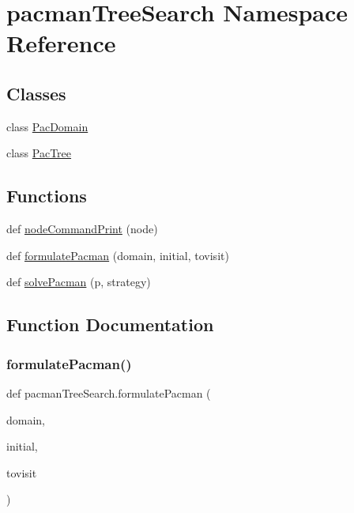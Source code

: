 \hypertarget{namespacepacman_tree_search}{}\section{pacman\+Tree\+Search Namespace Reference}
\label{namespacepacman_tree_search}
\subsection*{Classes}
\begin{DoxyCompactItemize}
\item 
class \hyperlink{classpacman_tree_search_1_1_pac_domain}{Pac\+Domain}
\item 
class \hyperlink{classpacman_tree_search_1_1_pac_tree}{Pac\+Tree}
\end{DoxyCompactItemize}
\subsection*{Functions}
\begin{DoxyCompactItemize}
\item 
def \hyperlink{namespacepacman_tree_search_aa8b25e12152e2f3ad8e0326c06df08f7}{node\+Command\+Print} (node)
\item 
def \hyperlink{namespacepacman_tree_search_aa9f5c555ee9752da93771780f0509ce2}{formulate\+Pacman} (domain, initial, tovisit)
\item 
def \hyperlink{namespacepacman_tree_search_aa78c937974a23c85908702f6d69bbd5e}{solve\+Pacman} (p, strategy)
\end{DoxyCompactItemize}


\subsection{Function Documentation}
\mbox{\label{namespacepacman_tree_search_aa9f5c555ee9752da93771780f0509ce2}} 
\subsubsection{\texorpdfstring{formulate\+Pacman()}{formulatePacman()}}
{\footnotesize\ttfamily def pacman\+Tree\+Search.\+formulate\+Pacman (\begin{DoxyParamCaption}\item[{}]{domain,  }\item[{}]{initial,  }\item[{}]{tovisit }\end{DoxyParamCaption})}

